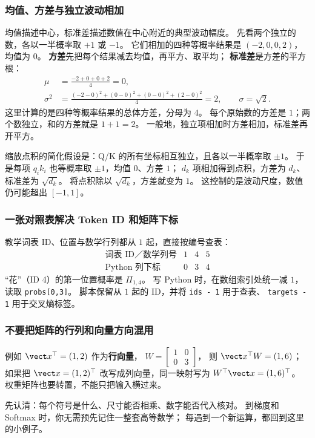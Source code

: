 \subsubsection*{均值、方差与独立波动相加}
\label{app:variance-scaling}

均值描述中心，标准差描述数值在中心附近的典型波动幅度。
先看两个独立的数，各以一半概率取 $+1$ 或 $-1$。
它们相加的四种等概率结果是 $(-2,0,0,2)$，均值为 $0$。
\textbf{方差}先把每个结果减去均值，再平方、取平均；
\textbf{标准差}是方差的平方根：
\[
\begin{aligned}
\mu&=\frac{-2+0+0+2}{4}=0,\\
\sigma^2&=\frac{(-2-0)^2+(0-0)^2+(0-0)^2+(2-0)^2}{4}=2,
\qquad \sigma=\sqrt2.
\end{aligned}
\]
这里计算的是四种等概率结果的总体方差，分母为 $4$。
每个原始数的方差是 $1$；两个数独立，和的方差就是 $1+1=2$。
一般地，独立项相加时方差相加，标准差再开平方。

缩放点积的简化假设是：Q/K 的所有坐标相互独立，且各以一半概率取 $\pm1$。
于是每项 $q_i k_i$ 也等概率取 $\pm1$，均值 $0$、方差 $1$；
$d_k$ 项相加得到点积，方差为 $d_k$、标准差为 $\sqrt{d_k}$。
将点积除以 $\sqrt{d_k}$，方差就变为 $1$。
这控制的是波动尺度，数值仍可能超出 $[-1,1]$。

\subsubsection*{一张对照表解决 Token ID 和矩阵下标}

教学词表 ID、位置与数学行列都从 $1$ 起，直接按编号查表：
\[
\begin{array}{c|ccc}
\text{词表 ID／数学列号} & 1 & 4 & 5\\\hline
\text{Python 列下标} & 0 & 3 & 4
\end{array}
\]
“花”（ID 4）的第一位置概率是 $\Pi_{1,4}$。
写 Python 时，在数组索引处统一减 $1$，读取 \texttt{probs[0,3]}。
脚本保留从 $1$ 起的 ID，并将 \texttt{ids - 1} 用于查表、
\texttt{targets - 1} 用于交叉熵标签。

\subsubsection*{不要把矩阵的行列和向量方向混用}

例如 $\vect x^\top=(1,2)$ 作为\textbf{行向量}，
$W=\begin{bmatrix}1&0\\0&3\end{bmatrix}$，
则 $\vect x^\top W=(1,6)$；如果把
$\vect x=(1,2)^\top$ 改写成列向量，同一映射写为
$W^\top\vect x=(1,6)^\top$。
权重矩阵也要转置，不能只把输入横过来。


\par\smallskip
先认清：每个符号是什么、尺寸能否相乘、数字能否代入核对。
到梯度和 Softmax 时，你无需预先记住一整套高等数学；
每遇到一个新运算，都回到这里的小例子。
